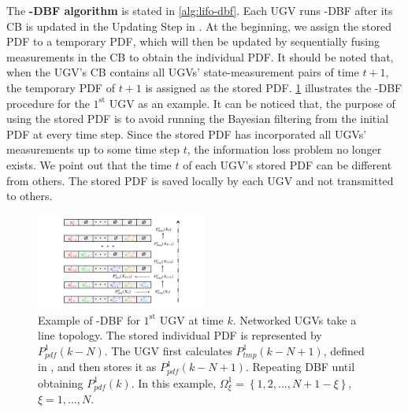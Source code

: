 	The \textbf{\proto-DBF algorithm} is stated in \cref{alg:lifo-dbf}.
	Each UGV runs \proto-DBF after its CB is updated in the Updating Step in .
	At the beginning, we assign the stored PDF to a temporary PDF, which will then be updated by sequentially fusing measurements in the CB to obtain the individual PDF.
	It should be noted that, when the UGV's CB contains all UGVs' state-measurement pairs of time $t+1$, the temporary PDF of $t+1$ is assigned as the stored PDF.
	\cref{fig:LIFO-DBF} illustrates the \proto-DBF procedure for the $1^\text{st}$ UGV as an example.
	It can be noticed that, the purpose of using the stored PDF is to avoid running the Bayesian filtering from the initial PDF at every time step. 
	Since the stored PDF has incorporated all UGVs' measurements up to some time step $t$, the information loss problem no longer exists. %
	We point out that the time $t$ of each UGV's stored PDF can be different from others.
	The stored PDF is saved locally by each UGV and not transmitted to others.
	
	\begin{figure}%
		\centering
		\includegraphics[width=0.50\textwidth]{figures/fifo-dbf}
		\caption{Example of \proto-DBF for $1^\text{st}$ UGV at time $k$.
			Networked UGVs take a line topology.
			The stored individual PDF is represented by $ P^1_{pdf}(k-N)$.
			The UGV first calculates $ P^1_{tmp}(k-N+1)$, defined in , and then stores it as $ P^1_{pdf}(k-N+1)$. 
			Repeating DBF until obtaining $ P^1_{pdf}(k)$.
			In this example, $\Omega^1_{\xi}=\left\lbrace 1,2,\dots,N+1-\xi\right\rbrace $, $\xi=1,\dots,N$.}
		\label{fig:LIFO-DBF}
		\vspace{-1em}
	\end{figure}
			
